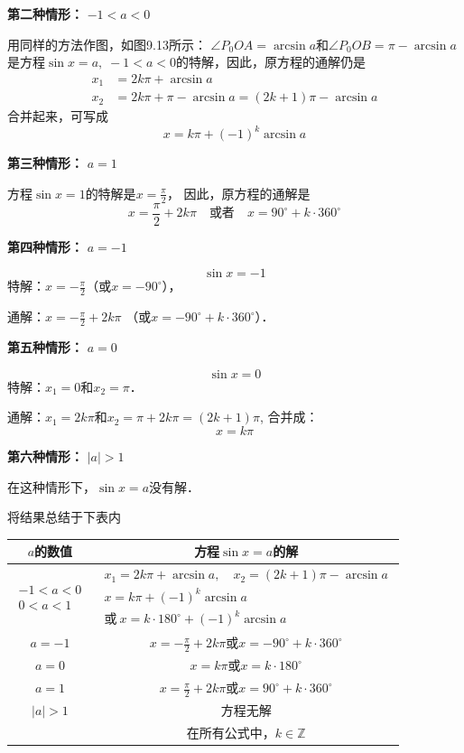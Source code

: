 \textbf{第二种情形：} $-1<a<0$

用同样的方法作图，如图9.13所示：
$\angle P_0OA=\arcsin a$和$\angle P_0OB=\pi-\arcsin a$是方程$\sin x=a,\; -1<a<0$的特解，因此，原方程的通解仍是
\[\begin{split}
  x_1&=2k\pi +\arcsin a\\
x_2&=2k\pi +\pi -\arcsin a=(2k+1)\pi -\arcsin a  
\end{split}\]
合并起来，可写成
\[x=k\pi +(-1)^k\arcsin a\]

\textbf{第三种情形：} $a=1$

方程$\sin x=1$的特解是$x=\frac{\pi}{2}$，
因此，原方程的通解是
\[x=\frac{\pi}{2}+2k\pi\quad \text{或者}\quad x=90^{\circ}+k\cdot 360^{\circ}\]

\textbf{第四种情形：} $a=-1$

\[\sin x=-1\]
特解：$x=-\frac{\pi}{2}$（或$x=-90^{\circ}$），

通解：$x=-\frac{\pi}{2}+2k\pi$ （或$x=-90^{\circ}+k\cdot 360^{\circ}$）．

\textbf{第五种情形：} $a=0$

\[\sin x=0\]
特解：$x_1=0$和$x_2=\pi$．

通解：$x_1=2k\pi$和$x_2=\pi +2k\pi =(2k+1)\pi$,
合并成：\[x=k\pi\]

\textbf{第六种情形：} $|a|>1$

在这种情形下，$\sin x=a$没有解．

将结果总结于下表内
\begin{center}
\begin{tabular}{c|c}
    \hline
$a$的数值& 方程$\sin x=a$的解\\
    \hline
$\begin{array}{c}-1<a<0\\ 0<a<1\end{array}$ & $\begin{array}{c}x_1=2k\pi+\arcsin a,\quad x_2=(2k+1)\pi-\arcsin a\\ x=k\pi +(-1)^k\arcsin a\\ \text{或}\ x=k\cdot 180^{\circ}+(-1)^k\arcsin a\end{array}$\\
$a=-1$& $x=-\frac{\pi}{2}+2k\pi$或$x=-90^{\circ}+k\cdot 360^{\circ}$\\
$a=0$&   $x=k\pi$或$x=k\cdot 180^{\circ}$\\
$a=1$& $x=\frac{\pi}{2}+2k\pi$或$x=90^{\circ}+k\cdot 360^{\circ}$\\
$|a|>1$ & 方程无解\\
    \hline
& 在所有公式中，$k\in\mathbb{Z}$\\
    \hline
\end{tabular}   
\end{center}

